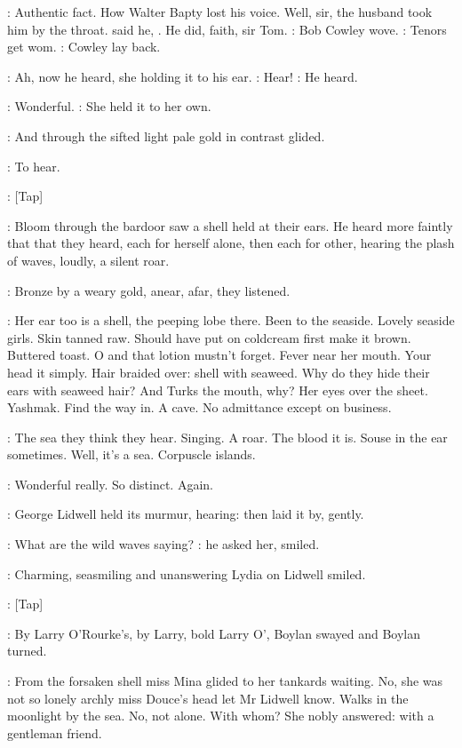\BloomInt:
Authentic fact.
How Walter Bapty lost his voice.
Well,
sir,
the husband took him by the throat.
said he,
.
He did,
faith,
sir Tom.
:
Bob Cowley wove.
\BloomInt:
Tenors get wom.
:
Cowley lay back.

:
Ah,
now he heard,
she holding it to his ear.
\MissD:
Hear!
:
He heard.

\lidwell:
Wonderful.
:
She held it to her own.

:
And through the sifted light pale gold
in contrast glided.

\BloomInt:
To hear.

\stripling:
[Tap]

:
Bloom through the bardoor saw a shell held at their ears.
He heard
more faintly that that they heard,
each for herself alone,
then each for
other,
hearing the plash of waves,
loudly,
a silent roar.

:
Bronze by a weary gold,
anear,
afar,
they listened.

\BloomInt:
Her ear too is a shell,
the peeping lobe there.
Been to the seaside.
Lovely seaside girls.
Skin tanned raw.
Should have put on coldcream first
make it brown.
Buttered toast.
O and that lotion mustn't forget.
Fever
near her mouth.
Your head it simply.
Hair braided over:
shell with
seaweed.
Why do they hide their ears with seaweed hair?
And Turks the
mouth,
why?
Her eyes over the sheet.
Yashmak.
Find the way in.
A cave.
No
admittance except on business.

\BloomInt:
The sea they think they hear.
Singing.
A roar.
The blood it is.
Souse
in the ear sometimes.
Well,
it's a sea.
Corpuscle islands.

\lidwell:
Wonderful really.
So distinct.
Again.

:
George Lidwell held its murmur,
hearing:
then laid it by,
gently.

\lidwell:
What are the wild waves saying?
:
he asked her,
smiled.

:
Charming,
seasmiling and unanswering
Lydia on Lidwell smiled.

\stripling:
[Tap]

:
By Larry O'Rourke's,
by Larry,
bold Larry O',
Boylan swayed and
Boylan turned.

:
From the forsaken shell miss Mina glided to her tankards waiting.
No,
she was not so lonely archly miss Douce's head let Mr Lidwell know.
Walks in the moonlight by the sea.
No,
not alone.
With whom?
She nobly
answered:
with a gentleman friend.

